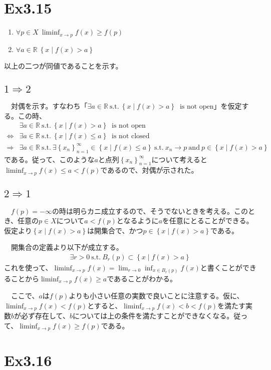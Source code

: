 \documentclass{article}
\begin{document}
\section{Ex3.15}
\begin{enumerate}
	\item $\forall p \in X\ \liminf_{x\to p} f(x) \geq f(p)$ 
	\item $\forall a\in \mathbb{R}\ \left\{ x\mid f(x) >a\right\}$
\end{enumerate}
以上の二つが同値であることを示す。

\subsection{$1\Rightarrow 2$}
　対偶を示す。すなわち「$\exists a\in \mathbb{R}\ \text{s.t.}\ \left\{ x\mid f(x) > a \right\}\ \text{\ is not open}$」を仮定する。この時、
\begin{align*}
&\exists a\in \mathbb{R}\ \text{s.t.}\ \left\{ x\mid f(x) > a \right\}\ \text{\ is not open}\\
\Leftrightarrow
&\exists a\in \mathbb{R}\ \text{s.t.}\ \left\{ x\mid f(x) \leq a \right\}\ \text{\ is not closed}\\
\Rightarrow
&\exists a\in \mathbb{R}\ \text{s.t.}\  \exists \left\{ x_n \right\}_{n=1}^{\infty} \in \left\{x\mid f(x) \leq a \right\}\ \text{s.t.}\ x_n \to p\ \text{and}\ p\in \left\{x\mid f(x) > a \right\}
\end{align*}
である。従って、このような$a$と点列$\left\{ x_n \right\}_{n=1}^{\infty}$について考えると$\liminf_{x\to p} f(x) \leq a < f(p)$であるので、対偶が示された。


\subsection{$2\Rightarrow 1$}
　$f(p) = -\infty$の時は明らカニ成立するので、そうでないときを考える。このとき、任意の$p\in X$について$a < f(p)$となるように$a$を任意にとることができる。仮定より$\left\{ x\mid f(x) > a \right\}$は開集合で、かつ$p \in \left\{ x\mid f(x) > a \right\}$である。

　開集合の定義より以下が成立する。
\begin{align*}
	\exists r>0\ \text{s.t.}\ B_{r}(p) \subset \left\{ x\mid f(x) > a \right\}
\end{align*}
これを使って、$\liminf_{x\to p} f(x) = \lim_{r\to 0} \inf_{x\in B_{r}(p)} f(x)$と書くことができることから$\liminf_{x\to p} f(x) \geq a$であることがわかる。

　ここで、$a$は$f(p)$よりも小さい任意の実数で良いことに注意する。仮に、$\liminf_{x\to p} f(x) < f(p)$とすると、$\liminf_{x\to p} f(x) < b < f(p)$を満たす実数$b$が必ず存在して、$b$については上の条件を満たすことができなくなる。従って、$\liminf_{x\to p} f(x) \geq f(p)$である。

\section{Ex3.16}
\end{document}
